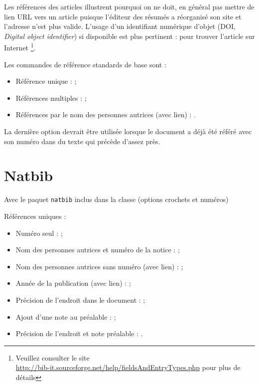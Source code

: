 Les références des articles \cite{FRA.05-TR9, FF.07-ICFEM} illustrent pourquoi on ne doit, en général pas mettre de lien URL vers un article puisque l'éditeur des résumés a réorganisé son site et l'adresse n'est plus valide. L'usage d'un identifiant numérique d'objet (DOI, \textit{Digital object identifier}) si disponible est plus pertinent : \cite{FF.07-ICFEM, FFL.05-SOSYM} pour trouver l'article sur Internet \cite{Uqam.presGuide.18} \footnote{Veuillez consulter le site \\
\url{http://bib-it.sourceforge.net/help/fieldsAndEntryTypes.php} pour plus de détails}.

Les commandes de référence standards de base sont :
\begin{itemize}
	\item Référence unique : \cite{Abr.96-BBook};
	\item Références multiples : \cite{deriche95, tschumperle02, weickert97};
	\item Références par le nom des personnes autrices (avec lien) : \citeauthor{deriche95}.
\end{itemize}
La dernière option devrait être utilisée lorsque le document a déjà été référé avec son numéro dans du texte qui précède d'assez près.

\section{Natbib}

Avec le paquet \texttt{natbib} inclus dans la classe (options crochets et numéros)

Références uniques :
\begin{itemize} 
	\item Numéro seul : \citep{deriche95};
	\item Nom des personnes autrices et numéro de la notice : \citet{deriche95};
	\item Nom des personnes autrices sans numéro (avec lien) : \citeauthor{deriche95};
	\item Année de la publication (avec lien) : \citeyear{deriche95};
	\item Précision de l'endroit dans le document : \citep[chap. 2]{deriche95};
	\item Ajout d'une note au préalable : \citep[par exemple][]{Essen2012};
	\item Précision de l'endroit et note préalable : \citep[p.ex.][p. 32]{Essen2012}.
\end{itemize}


